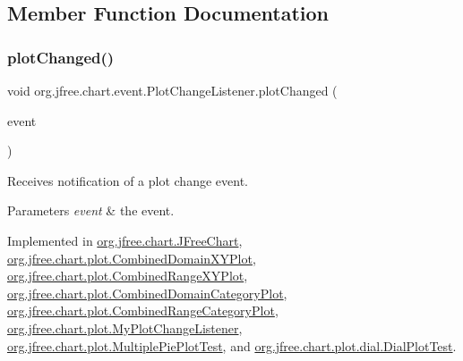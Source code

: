 \subsection{Member Function Documentation}
\mbox{\label{interfaceorg_1_1jfree_1_1chart_1_1event_1_1_plot_change_listener_aff1bdd2cc91287021b58a2ae67aa159d}} 
\subsubsection{\texorpdfstring{plot\+Changed()}{plotChanged()}}
{\footnotesize\ttfamily void org.\+jfree.\+chart.\+event.\+Plot\+Change\+Listener.\+plot\+Changed (\begin{DoxyParamCaption}\item[{\mbox{\hyperlink{classorg_1_1jfree_1_1chart_1_1event_1_1_plot_change_event}{Plot\+Change\+Event}}}]{event }\end{DoxyParamCaption})}

Receives notification of a plot change event.


\begin{DoxyParams}{Parameters}
{\em event} & the event. \\
\hline
\end{DoxyParams}


Implemented in \mbox{\hyperlink{classorg_1_1jfree_1_1chart_1_1_j_free_chart_a179c3ec3d9623b1534f1f6ec466c64ed}{org.\+jfree.\+chart.\+J\+Free\+Chart}}, \mbox{\hyperlink{classorg_1_1jfree_1_1chart_1_1plot_1_1_combined_domain_x_y_plot_a7a15ebdea6f0f11d30013d15724f3e86}{org.\+jfree.\+chart.\+plot.\+Combined\+Domain\+X\+Y\+Plot}}, \mbox{\hyperlink{classorg_1_1jfree_1_1chart_1_1plot_1_1_combined_range_x_y_plot_aa99c50d65ca0d6c9c2349f856c814554}{org.\+jfree.\+chart.\+plot.\+Combined\+Range\+X\+Y\+Plot}}, \mbox{\hyperlink{classorg_1_1jfree_1_1chart_1_1plot_1_1_combined_domain_category_plot_a96378adcdc9dbe0c53fbcb672118a26c}{org.\+jfree.\+chart.\+plot.\+Combined\+Domain\+Category\+Plot}}, \mbox{\hyperlink{classorg_1_1jfree_1_1chart_1_1plot_1_1_combined_range_category_plot_a61fbbb220a4534bdad83eaf286f9d508}{org.\+jfree.\+chart.\+plot.\+Combined\+Range\+Category\+Plot}}, \mbox{\hyperlink{classorg_1_1jfree_1_1chart_1_1plot_1_1_my_plot_change_listener_af86664f5f5b66e7d8e0f3940f3bcbfb2}{org.\+jfree.\+chart.\+plot.\+My\+Plot\+Change\+Listener}}, \mbox{\hyperlink{classorg_1_1jfree_1_1chart_1_1plot_1_1_multiple_pie_plot_test_a88e02d041d529a4d0b14a91a2e2758e6}{org.\+jfree.\+chart.\+plot.\+Multiple\+Pie\+Plot\+Test}}, and \mbox{\hyperlink{classorg_1_1jfree_1_1chart_1_1plot_1_1dial_1_1_dial_plot_test_ab4ae95b9ccee351cf787f78d8727753b}{org.\+jfree.\+chart.\+plot.\+dial.\+Dial\+Plot\+Test}}.



